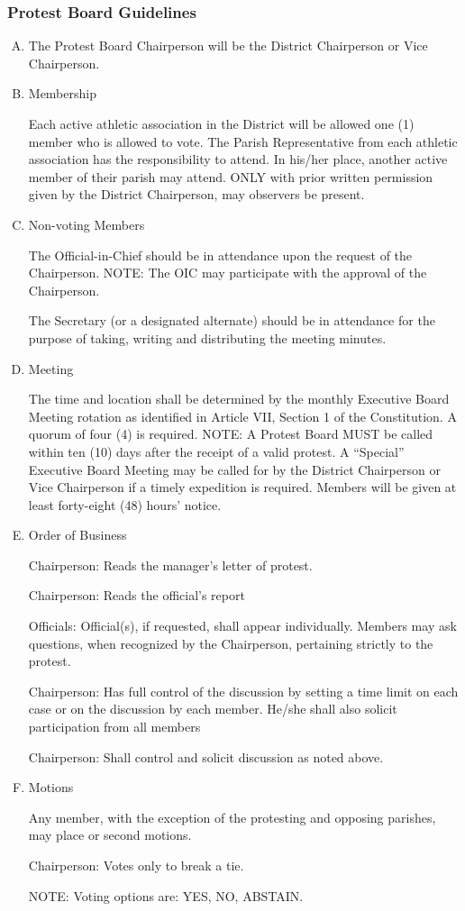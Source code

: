 \documentclass[letteraper,10pt,oneside,draft]{memoir}
\begin{document}
\subsubsection{Protest Board Guidelines}
\begin{enumerate}[A.]
    \item The Protest Board Chairperson will be the District Chairperson or Vice Chairperson.
    \item Membership

    Each active athletic association in the District will be allowed one (1) member who is allowed to vote.  The Parish Representative from each athletic association has the responsibility to attend.  In his/her place, another active member of their parish may attend.  ONLY with prior written permission given by the District Chairperson, may observers be present.
    \item Non-voting Members 

	The Official-in-Chief should be in attendance upon the request of the Chairperson.  NOTE:  The OIC may participate with the approval of the Chairperson. 

	The Secretary (or a designated alternate) should be in attendance for the purpose of taking, writing and distributing the meeting minutes.  
    \item Meeting   

	The time and location shall be determined by the monthly Executive Board Meeting rotation as identified in Article VII, Section 1 of the Constitution.  A quorum of four (4) is required.  NOTE:  A Protest Board MUST be called within ten (10) days after the receipt of a valid protest.  A “Special” Executive Board Meeting may be called for by the District Chairperson or Vice Chairperson if a timely expedition is required. Members will be given at least forty-eight (48) hours’ notice.

    \item Order of Business
	
       Chairperson:
       Reads the manager's letter of protest.
	
	Chairperson:
       Reads the official's report

       Officials:  
       Official(s), if requested, shall appear individually.  Members may ask questions, when recognized by the 
       Chairperson, pertaining strictly to the protest.

	Chairperson:
       Has full control of the discussion by setting a time limit on each case or on the discussion by each member. 
       He/she shall also solicit participation from all members

	Chairperson:  
       Shall control and solicit discussion as noted above.

    \item Motions

    Any member, with the exception of the protesting and opposing parishes, may place or second motions.

    Chairperson:  Votes only to break a tie.
    
    NOTE:  Voting options are:  YES, NO, ABSTAIN.
\end{enumerate}
\end{document}
